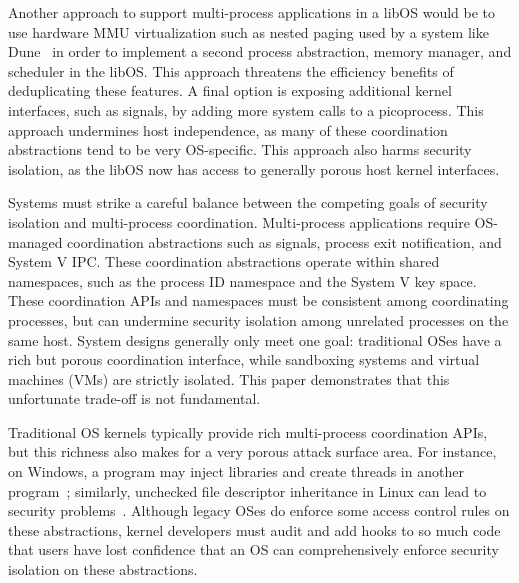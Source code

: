 \vspace{5pt}
Another approach to support multi-process applications in a libOS 
would be to use hardware MMU virtualization such as nested paging
used by a system like Dune~\cite{belay12dune}
in order to implement a second process abstraction, memory manager, and scheduler in the libOS.
This approach threatens the efficiency benefits of deduplicating these features.
A final option is exposing additional kernel interfaces, such as signals, 
by adding more system calls to a picoprocess.
This approach undermines host independence, as many of these coordination abstractions 
tend to be very OS-specific.
This approach also harms security isolation, as the libOS now has access to generally 
porous host kernel interfaces.  


Systems must strike a careful balance between the competing goals of
security isolation and
multi-process coordination.
Multi-process applications require OS-managed coordination abstractions
such as signals, process exit notification, and System V IPC.
These coordination abstractions operate within shared namespaces, such as the 
process ID namespace
and the System V key space.
These coordination APIs and namespaces must be consistent among coordinating processes,
but can %
undermine security isolation among unrelated processes on the same host.
System designs generally only meet one goal: 
traditional OSes have a rich but porous coordination interface, 
while sandboxing systems and virtual machines (VMs) 
are strictly isolated.
This paper demonstrates that this unfortunate trade-off is not
fundamental.


Traditional OS kernels typically provide  rich multi-process coordination 
APIs, but this richness also makes for a very porous attack surface
area.  For instance, on Windows, a program may inject libraries and
create threads in another program~\cite{windows-dll-inject}; 
similarly, unchecked file descriptor inheritance in Linux can lead to
security problems~\cite{close-on-exec}.  
Although legacy OSes do enforce some access control rules on these abstractions,
kernel developers must audit and add hooks to so much code
that
users have lost confidence that an OS can comprehensively enforce 
security isolation on these abstractions.

